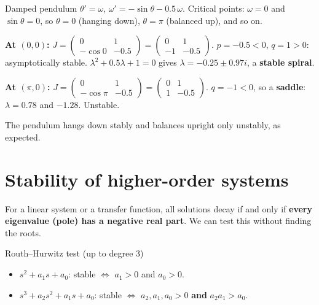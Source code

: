 \begin{examplebox}{Damped pendulum}
$\theta' = \omega$, $\omega' = -\sin\theta - 0.5\,\omega$. Critical points: $\omega=0$ and $\sin\theta=0$, so $\theta = 0$ (hanging down), $\theta=\pi$ (balanced up), and so on.

\textbf{At $(0,0)$:} $J = \begin{pmatrix}0&1\\-\cos0 & -0.5\end{pmatrix} = \begin{pmatrix}0&1\\-1&-0.5\end{pmatrix}$. $p=-0.5<0$, $q = 1>0$: asymptotically stable. $\lambda^2 + 0.5\lambda + 1=0$ gives $\lambda = -0.25\pm0.97i$, a \textbf{stable spiral}.

\textbf{At $(\pi,0)$:} $J = \begin{pmatrix}0&1\\-\cos\pi&-0.5\end{pmatrix} = \begin{pmatrix}0&1\\1&-0.5\end{pmatrix}$. $q = -1<0$, so a \textbf{saddle}: $\lambda = 0.78$ and $-1.28$. Unstable.

The pendulum hangs down stably and balances upright only unstably, as expected.
\end{examplebox}

\section{Stability of higher-order systems}

For a linear system or a transfer function, all solutions decay if and only if \textbf{every eigenvalue (pole) has a negative real part}. We can test this without finding the roots.

\begin{defbox}{Routh--Hurwitz test (up to degree 3)}
\begin{itemize}
  \item $s^2 + a_1s + a_0$: stable $\iff$ $a_1>0$ and $a_0>0$.
  \item $s^3 + a_2s^2 + a_1s + a_0$: stable $\iff$ $a_2,a_1,a_0>0$ \textbf{and} $a_2a_1 > a_0$.
\end{itemize}
\end{defbox}

